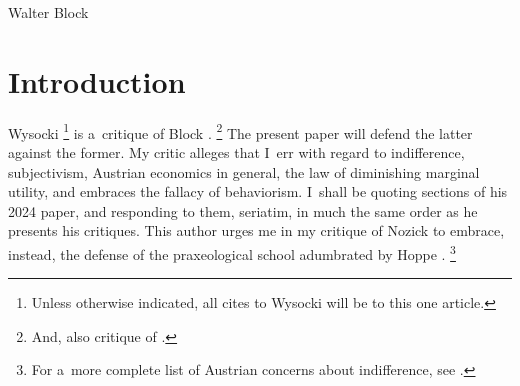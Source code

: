 \begin{artengenv}{Walter Block}
\section{Introduction}



\lettrine[loversize=0.13,lines=2,lraise=-0.03,nindent=0em,findent=0.2pt]%
{W}{}ysocki 
\parencite*[][]{wysocki_rejoinder_2024}%
\footnote{Unless otherwise indicated, all cites to Wysocki will be to this one article.} is a~critique of Block 
\parencite*[][]{block_response_2022}.%
\footnote{And, also critique of 
\parencites[][]{barnett_modern_2003}[][and Block]{block_robert_1980}[][]{block_rejoinder_2009}[][]{block_rejoinder_2009-1}[][]{block_response_2012}[][]{block_rejoinder_2019}.%
} The present paper will defend the latter against the former. My critic alleges that I~err with regard to indifference, subjectivism, Austrian economics in general, the law of diminishing marginal utility, and embraces the fallacy of behaviorism. I~shall be quoting sections of his 2024 paper, and responding to them, seriatim, in much the same order as he presents his critiques. This author urges me in my critique of Nozick 
\parencite[][]{block_robert_1980} %
 to embrace, instead, the defense of the praxeological school adumbrated by Hoppe 
\parencites*[][]{hoppe_note_2005}[][]{hoppe_must_2005}[][]{hoppe_further_2009}.%
\footnote{For a~more complete list of Austrian concerns about indifference, see 
\parencites[][]{barnett_modern_2003}[][]{block_robert_1980}[][]{block_austrian_1999}[][]{block_realism_2003}[][]{block_reply_2007}[][]{block_rejoinder_2009}[][]{block_rejoinder_2009-1}[][]{block_response_2012}[][]{block_rejoinder_2019}[][]{block_rejoinder_2010}[][]{block_response_2012}[][]{sotelo_indifference_2014}[][]{caplan_austrian_1999}[][]{caplan_probability_2001}[][]{caplan_probability_2003}[][]{caplan_trojan_2008}[][]{hoppe_must_2005}[][]{hoppe_note_2005}[][]{hoppe_further_2009}[][]{hulsmann_economic_1999}[][]{machaj_praxeological_2007}[][]{nozick_austrian_1977}[][]{oneill_choice_2010}[][]{sotelo_indifference_2014}[][]{wysocki_indifference_2016}[][]{wysocki_note_2017}[][]{wysocki_problem_2021}[][]{wysocki_rejoinder_2024}.%
}




\end{artengenv}
